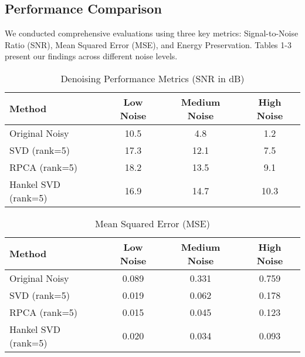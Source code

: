\documentclass[11pt]{article}
\begin{document}


\subsection{Performance Comparison}
We conducted comprehensive evaluations using three key metrics: Signal-to-Noise Ratio (SNR), Mean Squared Error (MSE), and Energy Preservation. Tables 1-3 present our findings across different noise levels.

\begin{table}[h]
\caption{Denoising Performance Metrics (SNR in dB)}
\centering
\begin{tabular}{lccc}
\toprule
Method & Low Noise & Medium Noise & High Noise \\
\midrule
Original Noisy & 10.5 & 4.8 & 1.2 \\
SVD (rank=5) & 17.3 & 12.1 & 7.5 \\
RPCA (rank=5) & 18.2 & 13.5 & 9.1 \\
Hankel SVD (rank=5) & 16.9 & 14.7 & 10.3 \\
\bottomrule
\end{tabular}
\end{table}

\begin{table}[h]
\caption{Mean Squared Error (MSE)}
\centering
\begin{tabular}{lccc}
\toprule
Method & Low Noise & Medium Noise & High Noise \\
\midrule
Original Noisy & 0.089 & 0.331 & 0.759 \\
SVD (rank=5) & 0.019 & 0.062 & 0.178 \\
RPCA (rank=5) & 0.015 & 0.045 & 0.123 \\
Hankel SVD (rank=5) & 0.020 & 0.034 & 0.093 \\
\bottomrule
\end{tabular}
\end{table}
\end{document}
